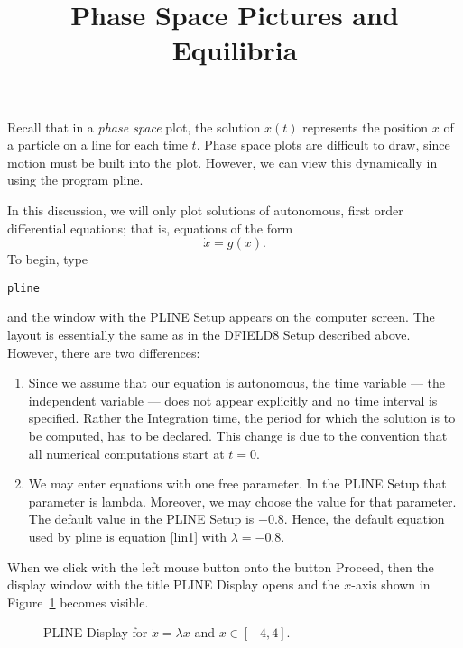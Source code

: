 \documentclass{ximera}
\title{Phase Space Pictures and Equilibria}
\begin{document}
\begin{abstract}
\end{abstract}
\maketitle

 \label{S:PSP&E}

Recall that in a {\em phase space\/}  plot, the 
solution $x(t)$ represents the position $x$ of a particle on a line 
for each time $t$.  Phase space plots are difficult to draw, since 
motion must be built into the plot.  However, we can view this 
dynamically in \Matlab using the program {\sf pline}. 

In this discussion, we will only plot solutions of autonomous,
first order differential equations; that is, equations of the
form
\[
\dot{x} = g(x).
\]
To begin, type
\begin{verbatim}
pline
\end{verbatim}
and the window with the {\sf PLINE Setup} appears on the
computer screen.  The layout is essentially the same as in the
{\sf DFIELD8 Setup} described above.  However, there are two
differences:
\begin{enumerate}
\item Since we assume that our equation is autonomous, the time
variable --- the independent variable --- does
not appear explicitly and no time interval is specified.  Rather
the {\sf Integration time}, the period for which the solution is
to be computed, has to be declared.  This change is due to the
convention that all numerical computations start at $t=0$.
\item We may enter equations with one free parameter.
In the {\sf PLINE Setup} that parameter is {\sf lambda}.
Moreover, we may choose the value for that parameter.  The
default value in the {\sf PLINE Setup} is $-0.8$.  Hence, the
default equation used by {\sf pline} is equation
\eqref{lin1} with $\lambda = -0.8$.
\end{enumerate}

When we click with the left mouse button onto the button {\sf
Proceed}, then the display window with the title {\sf PLINE
Display} opens and the $x$-axis shown in Figure~\ref{pl_dsp1}
becomes visible.

\begin{figure}[htb]
     \centerline{%
     }
     \caption{{\sf PLINE Display} for $\dot{x}=\lambda x$
                and $x\in [-4,4]$.}
     \label{pl_dsp1}
\end{figure}
\end{document}
